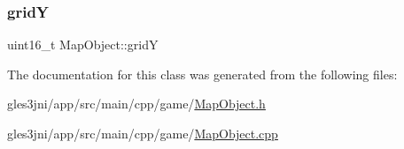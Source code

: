 \mbox{\label{class_map_object_a0d3a76d4816097941bbfb5208b81cab6}} 
\subsubsection{\texorpdfstring{gridY}{gridY}}
{\footnotesize\ttfamily uint16\+\_\+t Map\+Object\+::gridY\hspace{0.3cm}{\ttfamily [protected]}}



The documentation for this class was generated from the following files\+:\begin{DoxyCompactItemize}
\item 
gles3jni/app/src/main/cpp/game/\hyperlink{_map_object_8h}{Map\+Object.\+h}\item 
gles3jni/app/src/main/cpp/game/\hyperlink{_map_object_8cpp}{Map\+Object.\+cpp}\end{DoxyCompactItemize}
